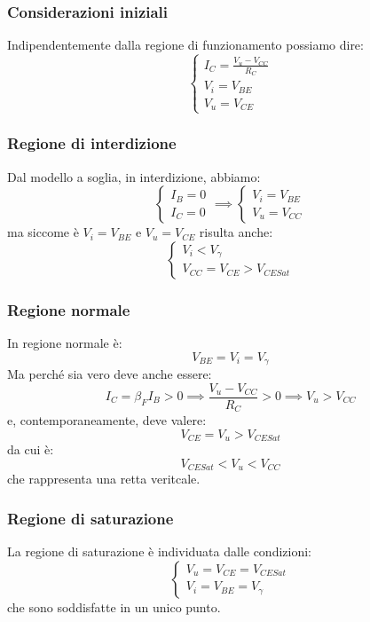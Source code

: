 \documentclass[../main.tex]{subfiles}
\begin{document}
	\subsubsection{Considerazioni iniziali}
	Indipendentemente dalla regione di funzionamento possiamo dire:
	$$\begin{cases} I_C = \frac{V_u - V_{CC}}{R_C} \\ V_i = V_{BE} \\ V_u = V_{CE} \end{cases}$$
	\subsubsection{Regione di interdizione}
	Dal modello a soglia, in interdizione, abbiamo:
	$$\begin{cases} I_B = 0 \\ I_C = 0 \end{cases} \implies \begin{cases} V_i = V_{BE} \\ V_u = V_{CC} \end{cases}$$
	ma siccome è $V_i = V_{BE}$ e $V_u = V_{CE}$ risulta anche:
	$$\begin{cases} V_i < V_\gamma \\ V_{CC} = V_{CE} > V_{CESat} \end{cases}$$
	\subsubsection{Regione normale}
	In regione normale è:
	$$V_{BE} = V_i = V_\gamma$$
	Ma perché sia vero deve anche essere:
	$$I_C = \beta_F I_B > 0 \implies \frac{V_u - V_{CC}}{R_C} > 0 \implies V_u > V_{CC}$$
	e, contemporaneamente, deve valere:
	$$V_{CE} = V_u > V_{CESat}$$
	da cui è:
	$$V_{CESat} < V_u < V_{CC}$$
	che rappresenta una retta veritcale.
	\subsubsection{Regione di saturazione}
	La regione di saturazione è individuata dalle condizioni:
	$$\begin{cases} V_u = V_{CE} = V_{CESat} \\ V_i = V_{BE} = V_\gamma \end{cases}$$
	che sono soddisfatte in un unico punto.
\end{document}
